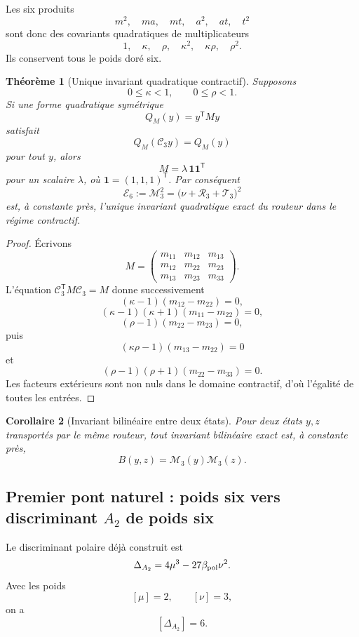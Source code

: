 \documentclass[11pt,a4paper]{article}
\newtheorem{theorem}{Théorème}[section]
\newtheorem{corollary}[theorem]{Corollaire}
\begin{document}
Les six produits
\[
 m^2,\quad ma,\quad mt,\quad a^2,\quad at,\quad t^2
\]
sont donc des covariants quadratiques de multiplicateurs
\[
 \boxed{
 1,\quad\kappa,\quad\rho,\quad
 \kappa^2,\quad\kappa\rho,\quad\rho^2.}
\]
Ils conservent tous le poids doré six.

\begin{theorem}[Unique invariant quadratique contractif]\label{thm:v20-unique-quadratic}
Supposons
\[
 0\le\kappa<1,\qquad 0\le\rho<1.
\]
Si une forme quadratique symétrique
\[
 Q_M(y)=y^{\mathsf T}My
\]
satisfait
\[
 Q_M(\mathcal C_3y)=Q_M(y)
\]
pour tout $y$, alors
\[
 \boxed{
 M=\lambda\,\mathbf1\mathbf1^{\mathsf T}}
\]
pour un scalaire $\lambda$, où $\mathbf1=(1,1,1)^{\mathsf T}$. Par conséquent
\[
 \boxed{
 \mathscr E_6
 :=
 \mathcal M_3^2
 =
 \bigl(
 \nu+\mathscr R_3+\mathscr T_3
 \bigr)^2}
\]
est, à constante près, l'unique invariant quadratique exact du routeur dans le régime contractif.
\end{theorem}

\begin{proof}
Écrivons
\[
 M=
 \begin{pmatrix}
 m_{11}&m_{12}&m_{13}\\
 m_{12}&m_{22}&m_{23}\\
 m_{13}&m_{23}&m_{33}
 \end{pmatrix}.
\]
L'équation $\mathcal C_3^{\mathsf T}M\mathcal C_3=M$ donne successivement
\[
 (\kappa-1)(m_{12}-m_{22})=0,
\]
\[
 (\kappa-1)(\kappa+1)(m_{11}-m_{22})=0,
\]
\[
 (\rho-1)(m_{22}-m_{23})=0,
\]
puis
\[
 (\kappa\rho-1)(m_{13}-m_{22})=0
\]
et
\[
 (\rho-1)(\rho+1)(m_{22}-m_{33})=0.
\]
Les facteurs extérieurs sont non nuls dans le domaine contractif, d'où l'égalité de toutes les entrées.
\end{proof}

\begin{corollary}[Invariant bilinéaire entre deux états]\label{cor:v20-bilinear}
Pour deux états $y,z$ transportés par le même routeur, tout invariant bilinéaire exact est, à constante près,
\[
 \boxed{
 B(y,z)=\mathcal M_3(y)\mathcal M_3(z).}
\]
\end{corollary}

\subsection{Premier pont naturel : poids six vers discriminant $A_2$ de poids six}

Le discriminant polaire déjà construit est
\[
 \Delta_{A_2}
 =
 4\mu^3-27\beta_{\rm pol}\nu^2.
\]
Avec les poids
\[
 [\mu]=2,\qquad[\nu]=3,
\]
on a
\[
 [\Delta_{A_2}]=6.
\]
\end{document}

